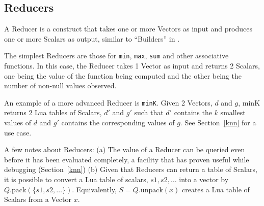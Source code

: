 \subsection{Reducers}
\label{reducers}

A Reducer is a construct that takes one or more Vectors as input and produces
one or more Scalars as output, similar to ``Builders'' in \cite{Weld2017}.

The simplest Reducers are those for {\tt min},
{\tt max}, {\tt sum} and other associative functions. 
In this case, the Reducer takes 1 Vector as input and 
returns 2 Scalars, one
being the value of the function being computed and the other being the number of
non-null values observed. 

An example of a more advanced Reducer is {\tt minK}. 
Given 2 Vectors, \(d\) and \(g\), minK returns 2
Lua tables of Scalars, \(d'\) and \(g'\) such that \(d'\) contains the \(k\)
smallest values of \(d\) and \(g'\) contains the corresponding values of \(g\).
See Section~\ref{knn} for a use case.

A few notes about Reducers: (a) 
The value of a Reducer can be queried even before it has been evaluated 
completely, a facility that has proven useful while debugging
(Section~\ref{knn})
(b) Given that Reducers can return a table of Scalars,
it is possible to 
convert a Lua table of scalars, \(s1, s2, \ldots\) into a vector by
\(Q.\mathrm{pack}(\{s1, s2, \ldots\})\).
Equivalently, \(S = Q.\mathrm{unpack}(x)\) creates a Lua table of Scalars from a
Vector \(x\).

